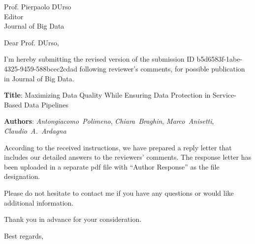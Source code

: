 \documentclass[12pt]{sriletter}
\begin{document}
\signature{\vspace*{-1.4cm}\\
	Claudio Ardagna}

\faxnumber{}

\begin{letter}{%
    Prof. Pierpaolo DUrso\\
    Editor\\
    Journal of Big Data\\
}

    \opening{Dear Prof. DUrso,}

    I'm hereby submitting the revised version of the submission ID b5d6583f-1abe-4325-9459-588bcec2cdad
    following reviewer's comments, for possible publication in Journal of Big Data.

    \textbf{Title}: Maximizing Data Quality While Ensuring Data Protection in Service-Based Data Pipelines\/

    \textbf{Authors}: \emph{Antongiacomo~Polimeno}, \emph{Chiara~Braghin}, \emph{Marco~Anisetti}, \emph{Claudio~A.~Ardagna}

    According to the received instructions, we have prepared a reply letter that includes our detailed answers to the reviewers' comments. The response letter has been uploaded in a separate pdf file with ``Author Response'' as the file designation.

    Please do not hesitate to contact me if you have any questions or would like additional information.

    Thank you in advance for your consideration.

    \closing{Best regards,}

\end{letter}
\end{document}
